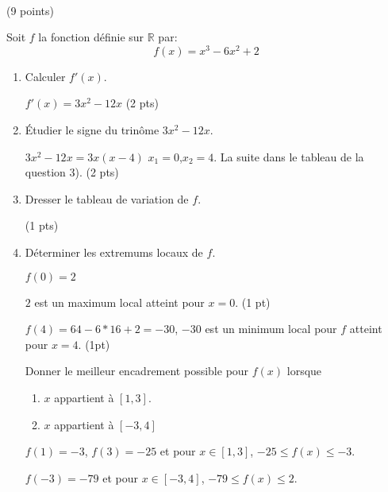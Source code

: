\documentclass[a4paper,11pt]{article}
\theoremstyle{break}
\begin{document}
   ~
  \vspace{0.5cm}
    
\begin{exo}(9 points)
~
      \vspace{0.25cm}
      
 Soit $f$ la fonction définie sur $\mathbb{R}$ par:
 \[f(x)=x^3-6x^2+2\]
 
 \begin{enumerate}
  \item Calculer $f'(x)$.
\begin{correction}

  $f'(x)=3x^2-12x$ (2 pts)
\end{correction}

  \item \'Etudier le signe du trinôme  $3x^2-12x$.
\begin{correction}

  $3x^2-12x=3x(x-4)$
  $x_1=0$,$x_2=4$. La suite dans le tableau de la
  question 3). (2 pts)
\end{correction}

  \item Dresser le tableau de variation de $f$.
\begin{correction}
  
    (1 pts)

\end{correction}

  \item Déterminer les extremums locaux de $f$.
\begin{correction}

  $f(0)=2$
  
  $2$ est un maximum local atteint pour $x=0$. (1 pt)
  
  $f(4)=64-6*16+2=-30$, $-30$ est un minimum local pour $f$ atteint pour $x=4$. (1pt)
\end{correction} 

\begin{item}
 Donner le meilleur encadrement possible pour $f(x)$ lorsque 
 \begin{enumerate}
 \item $x$ appartient à $[1,3]$.
  \item $x$ appartient à $[-3,4]$
 \end{enumerate}
 
\begin{correction}
  $f(1)=-3$, $f(3)=-25$ et pour $x \in [1,3]$, $-25 \leq f(x) \leq -3$.
  
  $f(-3)=-79$ et pour $x \in [-3,4]$, $-79 \leq f(x) \leq 2$.
\end{correction}

 

 
 
\end{item}

 \end{enumerate}

\end{exo}
\end{document}
